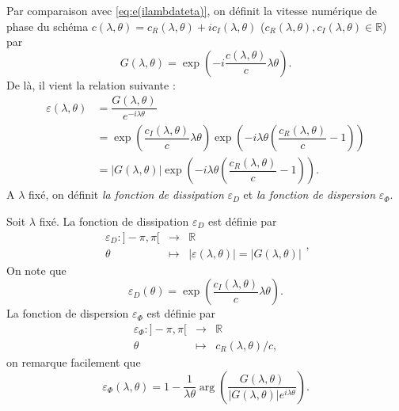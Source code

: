 Par comparaison avec \eqref{eq:e(ilambdateta)}, on définit la  vitesse numérique de phase du schéma $c(\lambda,\theta) = c_R(\lambda,\theta) + i c_I(\lambda,\theta)$ ($c_R(\lambda,\theta),c_I(\lambda,\theta) \in \mathbb{R}$) par
\begin{equation}
G(\lambda, \theta) = \exp \left( - i \dfrac{c(\lambda,\theta)}{c} \lambda \theta \right).
\end{equation}
De là, il vient la relation suivante :
\begin{align*}
\varepsilon(\lambda,\theta) & = \dfrac{G(\lambda,\theta)}{e^{- i \lambda \theta}} \\
	& = \exp \left( \dfrac{c_I(\lambda, \theta)}{c} \lambda \theta \right) \exp \left( - i \lambda \theta \left( \dfrac{c_R(\lambda, \theta)}{c} -1 \right) \right) \\
	& = |G(\lambda, \theta)| \exp \left( - i \lambda \theta \left( \dfrac{c_R(\lambda, \theta)}{c} -1 \right) \right).
\end{align*}
A $\lambda$ fixé, on définit \textit{la fonction de dissipation} $\varepsilon_D$ et \textit{la fonction de dispersion} $\varepsilon_{\Phi}$.

\begin{definition}
Soit $\lambda$ fixé.
La fonction de dissipation $\varepsilon_D$ est définie par
\begin{equation}
\begin{array}{rcl}
\varepsilon_D : ]- \pi, \pi[ & \rightarrow & \mathbb{R} \\
\theta & \mapsto & |\varepsilon(\lambda,\theta)| = |G(\lambda, \theta)|
\end{array},
\end{equation}
On note que 
\begin{equation}
\varepsilon_D(\theta) = \exp \left( \dfrac{c_I(\lambda, \theta)}{c} \lambda \theta \right).
\end{equation}
La fonction de dispersion $\varepsilon_{\Phi}$ est définie par
\begin{equation}
\begin{array}{rcl}
\varepsilon_{\Phi} : ]- \pi, \pi[ & \rightarrow & \mathbb{R} \\
\theta & \mapsto & c_R(\lambda, \theta)/c,
\end{array}
\end{equation}
on remarque facilement que 
\begin{equation}
\varepsilon_{\Phi}(\lambda, \theta) = 1 - \dfrac{1}{\lambda \theta} \arg \left( \dfrac{G(\lambda, \theta)}{|G(\lambda,\theta)| e^{i \lambda \theta}} \right).
\end{equation}
\end{definition}

